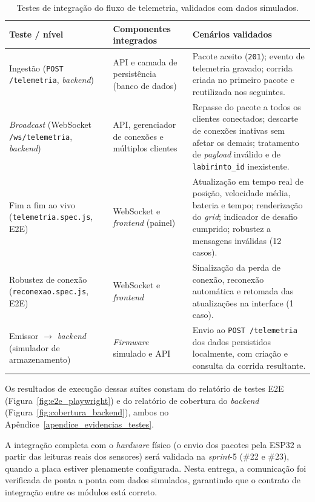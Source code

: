 \begin{table}[H]
    \centering
    \caption{Testes de integração do fluxo de telemetria, validados com dados simulados.}
    \label{tab:testes_integracao}
    \small
    \begin{tabular}{|p{4.2cm}|p{3.6cm}|p{5.2cm}|}
        \hline
        \textbf{Teste / nível} & \textbf{Componentes integrados} &
        \textbf{Cenários validados} \\ \hline
        Ingestão (\texttt{POST /telemetria}, \textit{backend}) &
        API e camada de persistência (banco de dados) &
        Pacote aceito (\texttt{201}); evento de telemetria gravado; corrida criada no
        primeiro pacote e reutilizada nos seguintes. \\ \hline
        \textit{Broadcast} (WebSocket \texttt{/ws/telemetria}, \textit{backend}) &
        API, gerenciador de conexões e múltiplos clientes &
        Repasse do pacote a todos os clientes conectados; descarte de conexões inativas
        sem afetar os demais; tratamento de \textit{payload} inválido e de
        \texttt{labirinto\_id} inexistente. \\ \hline
        Fim a fim ao vivo (\texttt{telemetria.spec.js}, E2E) &
        WebSocket e \textit{frontend} (painel) &
        Atualização em tempo real de posição, velocidade média, bateria e tempo;
        renderização do \textit{grid}; indicador de desafio cumprido; robustez a
        mensagens inválidas (12 casos). \\ \hline
        Robustez de conexão (\texttt{reconexao.spec.js}, E2E) &
        WebSocket e \textit{frontend} &
        Sinalização da perda de conexão, reconexão automática e retomada das
        atualizações na interface (1 caso). \\ \hline
        Emissor $\rightarrow$ \textit{backend} (simulador de armazenamento) &
        \textit{Firmware} simulado e API &
        Envio ao \texttt{POST /telemetria} dos dados persistidos localmente, com
        criação e consulta da corrida resultante. \\ \hline
    \end{tabular}
\end{table}

Os resultados de execução dessas suítes constam do relatório de testes E2E
(Figura~\ref{fig:e2e_playwright}) e do relatório de cobertura do \textit{backend}
(Figura~\ref{fig:cobertura_backend}), ambos no
Apêndice~\ref{apendice_evidencias_testes}.

A integração completa com o \textit{hardware} físico (o envio dos pacotes pela
ESP32 a partir das leituras reais dos sensores) será validada na \textit{sprint}-5
(\#22 e \#23), quando a placa estiver plenamente configurada. Nesta entrega, a
comunicação foi verificada de ponta a ponta com dados simulados, garantindo que o
contrato de integração entre os módulos está correto.

